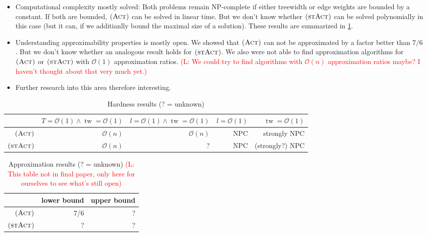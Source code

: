 \documentclass[10pt,a4paper]{article}
\numberwithin{equation}{section}
\newcommand{\comment}[1]{\textcolor{red}{(L: #1)}}
\newcommand{\bigO}{\mathcal{O}}
\newcommand{\act}{\textsc{(Act)}}
\newcommand{\stact}{\textsc{(stAct)}}
\DeclareMathOperator{\tw}{tw}
\begin{document}
\begin{itemize}
\item Computational complexity mostly solved: Both problems remain NP-complete if either treewidth or edge weights are bounded by a constant. If both are bounded, $\act$ can be solved in linear time. But we don't know whether $\stact$ can be solved polynomially in this case (but it can, if we additianlly bound the maximal size of a solution). These results are summarized in \cref{table_complexity}.
\item Understanding approximability properties is mostly open. We showed that $\act$ can not be approximated by a factor better than $7/6$. But we don't know whether an analogous result holds for $\stact$. We also were not able to find approximation algorithms for $\act$ or $\stact$ with $\bigO(1)$ approximation ratios. \comment{We could try to find algorithms with $\bigO(n)$ approximation ratios maybe? I haven't thought about that very much yet.}
\item Further research into this area therefore interesting.
\end{itemize}


\begin{table}
\begin{tabular}{r|rrrr}
& $T = \bigO(1) \land \tw = \bigO(1)$ & $l = \bigO(1) \land \tw = \bigO(1)$ & $l = \bigO(1)$ & $\tw = \bigO(1)$\\
\hline
$\act$ & $\bigO(n)$ & $\bigO(n)$ & NPC & strongly NPC \\
$\stact$ & $\bigO(n)$ & ? & NPC & (strongly?) NPC \\
\end{tabular}
\caption{Hardness results (? = unknown)}
\label{table_complexity}
\end{table}

\begin{table}
\begin{tabular}{r|rr}
& lower bound & upper bound \\
\hline
$\act$ & 7/6 & ?  \\
$\stact$ & ? & ? \\
\end{tabular}
\caption{Approximation results (? = unknown) \comment{This table not in final paper, only here for ourselves to see what's still open}}
\end{table}

\printbibliography


\appendix
\end{document}
